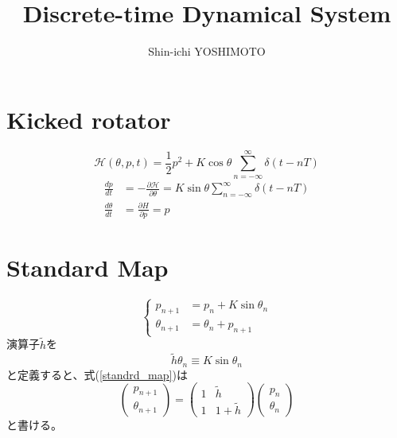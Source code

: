 \documentclass[]{jlreq}
\begin{document}
\title{Discrete-time Dynamical System}
\author{Shin-ichi YOSHIMOTO}
\maketitle
\tableofcontents
\clearpage

\section{Kicked rotator}
%
\begin{equation}
    \mathcal{H}(\theta, p, t) = \frac{1}{2}p^2 + K \cos\theta \sum_{n=-\infty}^{\infty}\delta(t - n T)
\end{equation}
%
\begin{align}
    \frac{dp}{dt} &= -\frac{\partial \mathcal{H}}{\partial \theta} = K \sin\theta \sum_{n=-\infty}^{\infty}\delta(t - n T)\\
    \frac{d\theta}{dt} &= \frac{\partial H}{\partial p} = p
\end{align}
%
\section{Standard Map}
%
\begin{equation}
    \left\{
    \begin{aligned}
        p_{n+1} &= p_n + K\sin\theta_n \\
        \theta_{n+1} &= \theta_n + p_{n+1}
        \label{standrd_map}
    \end{aligned}
    \right.
\end{equation}
%
演算子$\tilde{h}$を
%
\begin{equation}
    \tilde{h}\theta_n \equiv K \sin\theta_n
\end{equation}
%
と定義すると、式(\ref{standrd_map})は
%
\begin{equation}
    \begin{pmatrix}
        p_{n+1}\\
        \theta_{n+1}
    \end{pmatrix}
    =
    \begin{pmatrix}
        1 & \tilde{h} \\
        1 & 1+\tilde{h}
    \end{pmatrix}
    \begin{pmatrix}
        p_n \\
        \theta_n
    \end{pmatrix}
\end{equation}
%
と書ける。
\end{document}
